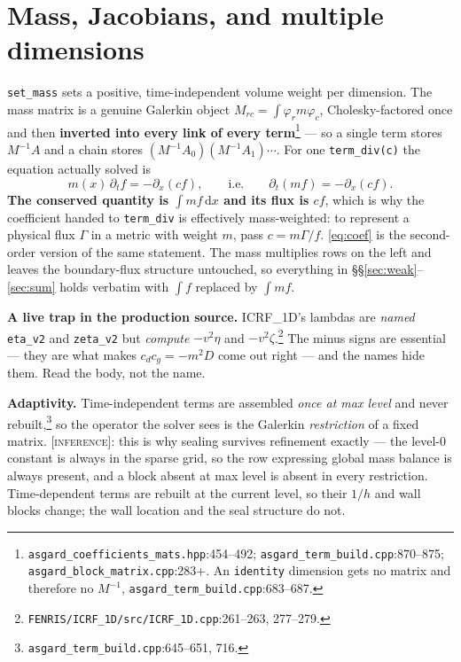 \documentclass[10pt]{article}
\newcommand{\code}[1]{\texttt{#1}}
\newcommand{\dd}{\,\mathrm{d}}
\newcommand{\INF}{\textcolor{red!60!black}{\textsc{[inference]}}}
\newcommand{\fl}[2]{\texttt{#1}:#2}
\begin{document}
\section{Mass, Jacobians, and multiple dimensions}
\label{sec:mass}

\code{set\_mass} sets a positive, time-independent volume weight per dimension.
The mass matrix is a genuine Galerkin object $M_{rc}=\int\varphi_r m\varphi_c$,
Cholesky-factored once and then \textbf{inverted into every link of every
term}\footnote{\fl{asgard\_coefficients\_mats.hpp}{454--492};
\fl{asgard\_term\_build.cpp}{870--875}; \fl{asgard\_block\_matrix.cpp}{283+}. An
\code{identity} dimension gets no matrix and therefore no $M^{-1}$,
\fl{asgard\_term\_build.cpp}{683--687}.} --- so a single term stores $M^{-1}A$
and a chain stores $(M^{-1}A_0)(M^{-1}A_1)\cdots$. For one \code{term\_div(c)}
the equation actually solved is
\begin{equation}
  m(x)\,\partial_t f = -\partial_x(c f),
  \qquad\text{i.e.}\qquad \partial_t(mf) = -\partial_x(cf).
  \label{eq:masseq}
\end{equation}
\textbf{The conserved quantity is $\int mf\dd x$ and its flux is $cf$}, which is
why the coefficient handed to \code{term\_div} is effectively mass-weighted: to
represent a physical flux $\Gamma$ in a metric with weight $m$, pass
$c=m\Gamma/f$. \eqref{eq:coef} is the second-order version of the same statement.
The mass multiplies rows on the left and leaves the boundary-flux structure
untouched, so everything in \S\S\ref{sec:weak}--\ref{sec:sum} holds verbatim with
$\int f$ replaced by $\int mf$.

\textbf{A live trap in the production source.} ICRF\_1D's lambdas are \emph{named}
\code{eta\_v2} and \code{zeta\_v2} but \emph{compute} $-v^2\eta$ and
$-v^2\zeta$.\footnote{\code{FENRIS/ICRF\_1D/src/ICRF\_1D.cpp}:261--263, 277--279.}
The minus signs are essential --- they are what makes $c_dc_g=-m^2D$ come out
right --- and the names hide them. Read the body, not the name.

\textbf{Adaptivity.} Time-independent terms are assembled \emph{once at max
level} and never rebuilt,\footnote{\fl{asgard\_term\_build.cpp}{645--651, 716}.}
so the operator the solver sees is the Galerkin \emph{restriction} of a fixed
matrix. \INF{}: this is why sealing survives refinement exactly --- the level-0
constant is always in the sparse grid, so the row expressing global mass balance
is always present, and a block absent at max level is absent in every
restriction. Time-dependent terms are rebuilt at the current level, so their
$1/h$ and wall blocks change; the wall location and the seal structure do not.
\end{document}
